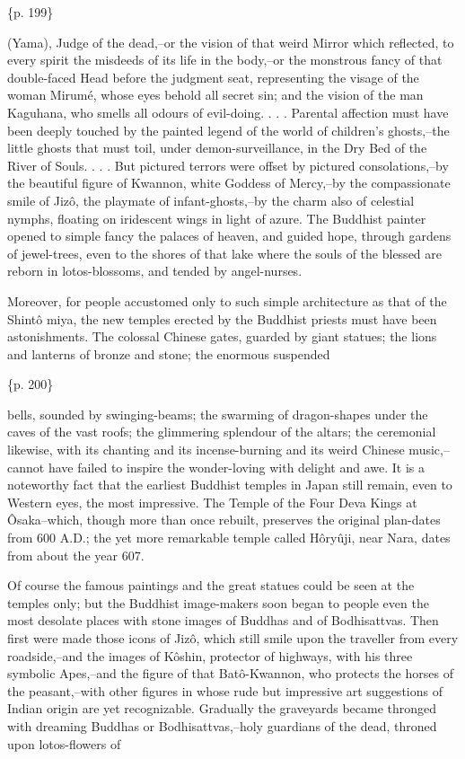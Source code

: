 \{p. 199\}

(Yama), Judge of the dead,--or the vision of that weird Mirror which reflected, to every spirit the misdeeds of its life in the body,--or the monstrous fancy of that double-faced Head before the judgment seat, representing the visage of the woman Mirumé, whose eyes behold all secret sin; and the vision of the man Kaguhana, who smells all odours of evil-doing. . . . Parental affection must have been deeply touched by the painted legend of the world of children's ghosts,--the little ghosts that must toil, under demon-surveillance, in the Dry Bed of the River of Souls. . . . But pictured terrors were offset by pictured consolations,--by the beautiful figure of Kwannon, white Goddess of Mercy,--by the compassionate smile of Jizô, the playmate of infant-ghosts,--by the charm also of celestial nymphs, floating on iridescent wings in light of azure. The Buddhist painter opened to simple fancy the palaces of heaven, and guided hope, through gardens of jewel-trees, even to the shores of that lake where the souls of the blessed are reborn in lotos-blossoms, and tended by angel-nurses.

Moreover, for people accustomed only to such simple architecture as that of the Shintô miya, the new temples erected by the Buddhist priests must have been astonishments. The colossal Chinese gates, guarded by giant statues; the lions and lanterns of bronze and stone; the enormous suspended

\{p. 200\}

bells, sounded by swinging-beams; the swarming of dragon-shapes under the caves of the vast roofs; the glimmering splendour of the altars; the ceremonial likewise, with its chanting and its incense-burning and its weird Chinese music,--cannot have failed to inspire the wonder-loving with delight and awe. It is a noteworthy fact that the earliest Buddhist temples in Japan still remain, even to Western eyes, the most impressive. The Temple of the Four Deva Kings at Ôsaka--which, though more than once rebuilt, preserves the original plan-dates from 600 A.D.; the yet more remarkable temple called Hôryûji, near Nara, dates from about the year 607.

Of course the famous paintings and the great statues could be seen at the temples only; but the Buddhist image-makers soon began to people even the most desolate places with stone images of Buddhas and of Bodhisattvas. Then first were made those icons of Jizô, which still smile upon the traveller from every roadside,--and the images of Kôshin, protector of highways, with his three symbolic Apes,--and the figure of that Batô-Kwannon, who protects the horses of the peasant,--with other figures in whose rude but impressive art suggestions of Indian origin are yet recognizable. Gradually the graveyards became thronged with dreaming Buddhas or Bodhisattvas,--holy guardians of the dead, throned upon lotos-flowers of

